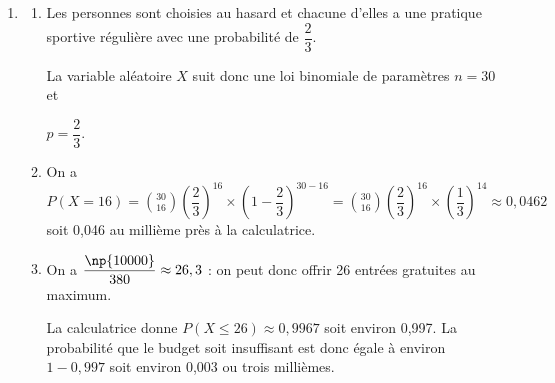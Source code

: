 \begin{enumerate}[resume]
\item %
	
	
	\begin{enumerate}
		\item %
Les personnes sont choisies au hasard et chacune d'elles a une pratique sportive régulière avec une probabilité de $\dfrac23$.

La variable aléatoire $X$ suit donc une loi binomiale de paramètres $n = 30$ et 

$p = \dfrac23$.
		\item %
		On a $P(X = 16) = \displaystyle\binom{30}{16} \left(\dfrac23\right)^{16}\times \left(1 - \dfrac23\right)^{30 - 16} = \displaystyle\binom{30}{16} \left(\dfrac23\right)^{16}\times \left(\dfrac13\right)^{14} \approx 0,0462$ soit 0,046 au millième près à la calculatrice.
		\item %
		
		
On a $\dfrac{\np{10000}}{380}\approx 26,3$ : on peut donc offrir 26 entrées gratuites au maximum.

La calculatrice donne $P(X \leqslant 26) \approx 0,9967$ soit environ 0,997.
La probabilité que le budget soit insuffisant est donc égale à environ $1 - 0,997$ soit environ 0,003 ou trois millièmes.
	\end{enumerate}
\end{enumerate}

\bigskip

